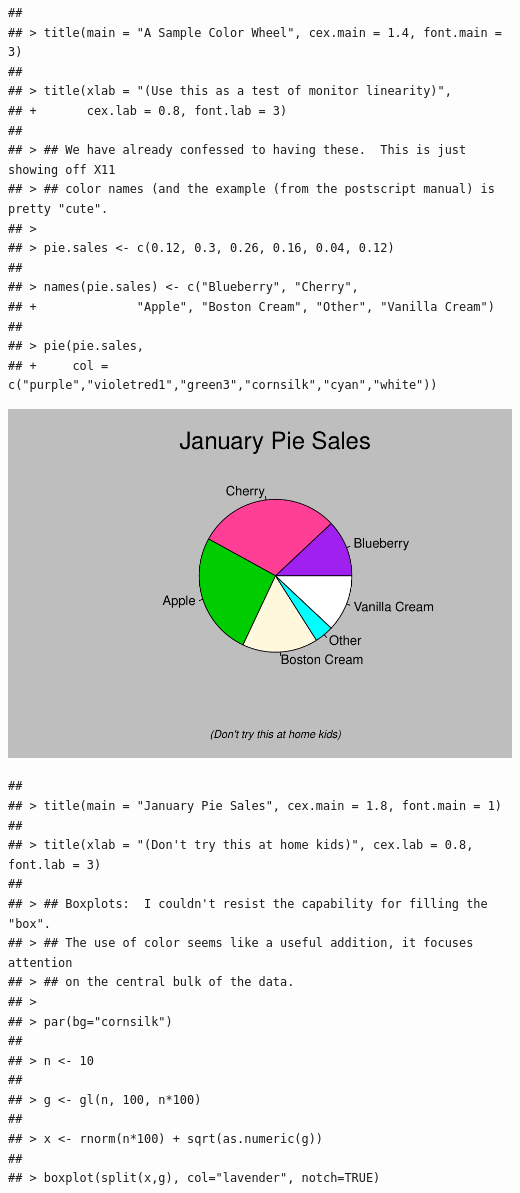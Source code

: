 \documentclass[
]{book}
\begin{document}
\begin{verbatim}
## 
## > title(main = "A Sample Color Wheel", cex.main = 1.4, font.main = 3)
## 
## > title(xlab = "(Use this as a test of monitor linearity)",
## +       cex.lab = 0.8, font.lab = 3)
## 
## > ## We have already confessed to having these.  This is just showing off X11
## > ## color names (and the example (from the postscript manual) is pretty "cute".
## > 
## > pie.sales <- c(0.12, 0.3, 0.26, 0.16, 0.04, 0.12)
## 
## > names(pie.sales) <- c("Blueberry", "Cherry",
## +              "Apple", "Boston Cream", "Other", "Vanilla Cream")
## 
## > pie(pie.sales,
## +     col = c("purple","violetred1","green3","cornsilk","cyan","white"))
\end{verbatim}

\includegraphics{bookdown-demo_files/figure-latex/unnamed-chunk-5-3.pdf}

\begin{verbatim}
## 
## > title(main = "January Pie Sales", cex.main = 1.8, font.main = 1)
## 
## > title(xlab = "(Don't try this at home kids)", cex.lab = 0.8, font.lab = 3)
## 
## > ## Boxplots:  I couldn't resist the capability for filling the "box".
## > ## The use of color seems like a useful addition, it focuses attention
## > ## on the central bulk of the data.
## > 
## > par(bg="cornsilk")
## 
## > n <- 10
## 
## > g <- gl(n, 100, n*100)
## 
## > x <- rnorm(n*100) + sqrt(as.numeric(g))
## 
## > boxplot(split(x,g), col="lavender", notch=TRUE)
\end{verbatim}
\end{document}
